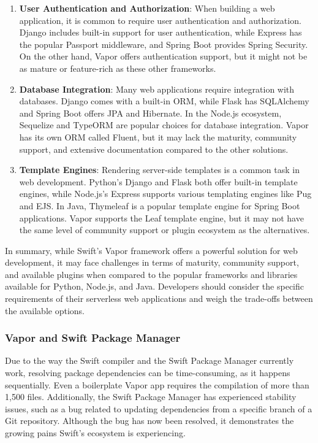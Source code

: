 \begin{enumerate}
    \item \textbf{User Authentication and Authorization}: When building a web application, it is common to require user authentication and authorization. Django includes built-in support for user authentication, while Express has the popular Passport middleware, and Spring Boot provides Spring Security. On the other hand, Vapor offers authentication support, but it might not be as mature or feature-rich as these other frameworks.
    \item \textbf{Database Integration}: Many web applications require integration with databases. Django comes with a built-in ORM, while Flask has SQLAlchemy and Spring Boot offers JPA and Hibernate. In the Node.js ecosystem, Sequelize and TypeORM are popular choices for database integration. Vapor has its own ORM called Fluent, but it may lack the maturity, community support, and extensive documentation compared to the other solutions.
    \item \textbf{Template Engines}: Rendering server-side templates is a common task in web development. Python's Django and Flask both offer built-in template engines, while Node.js's Express supports various templating engines like Pug and EJS. In Java, Thymeleaf is a popular template engine for Spring Boot applications. Vapor supports the Leaf template engine, but it may not have the same level of community support or plugin ecosystem as the alternatives.
\end{enumerate}

In summary, while Swift's Vapor framework offers a powerful solution for web development, it may face challenges in terms of maturity, community support, and available plugins when compared to the popular frameworks and libraries available for Python, Node.js, and Java. Developers should consider the specific requirements of their serverless web applications and weigh the trade-offs between the available options.

\subsubsection{Vapor and Swift Package Manager}

Due to the way the Swift compiler and the Swift Package Manager currently work, resolving package dependencies can be time-consuming, as it happens sequentially. Even a boilerplate Vapor app requires the compilation of more than 1,500 files. Additionally, the Swift Package Manager has experienced stability issues, such as a bug related to updating dependencies from a specific branch of a Git repository. Although the bug has now been resolved, it demonstrates the growing pains Swift's ecosystem is experiencing.    
    
    
